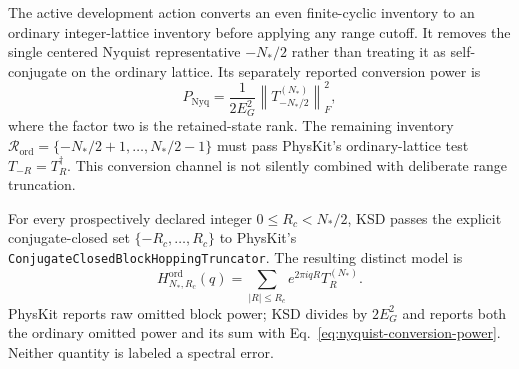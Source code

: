 \documentclass[11pt]{article}
\begin{document}
The active development action converts an even finite-cyclic inventory to an ordinary
integer-lattice inventory before applying any range cutoff. It removes the single
centered Nyquist representative $-N_*/2$ rather than treating it as self-conjugate on
the ordinary lattice. Its separately reported conversion power is
\begin{equation}
 P_{\mathrm{Nyq}}=\frac{1}{2E_G^2}
 \left\|T_{-N_*/2}^{(N_*)}\right\|_F^2,
 \label{eq:nyquist-conversion-power}
\end{equation}
where the factor two is the retained-state rank. The remaining inventory
$\mathcal R_{\mathrm{ord}}=\{-N_*/2+1,\ldots,N_*/2-1\}$ must pass PhysKit's
ordinary-lattice test $T_{-R}=T_R^\dagger$. This conversion channel is not silently
combined with deliberate range truncation.

For every prospectively declared integer $0\le R_c<N_*/2$, KSD passes the explicit
conjugate-closed set $\{-R_c,\ldots,R_c\}$ to PhysKit's
\texttt{ConjugateClosedBlockHoppingTruncator}. The resulting distinct model is
\begin{equation}
 H_{N_*,R_c}^{\mathrm{ord}}(q)=
 \sum_{|R|\le R_c}e^{2\pi iqR}T_R^{(N_*)}.
 \label{eq:ordinary-truncated-model}
\end{equation}
PhysKit reports raw omitted block power; KSD divides by $2E_G^2$ and reports both the
ordinary omitted power and its sum with Eq.~\eqref{eq:nyquist-conversion-power}.
Neither quantity is labeled a spectral error.
\end{document}
